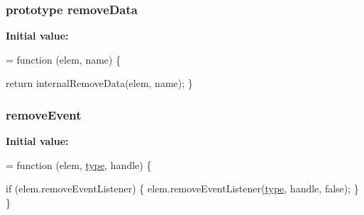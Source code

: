 \subsubsection[{\texorpdfstring{remove\+Data}{removeData}}]{ {\bf prototype} remove\+Data}\hypertarget{jquery-2_82_81-vsdoc_8js_a4da6cd95c6aa2933e1fc145392d22460}{}\label{jquery-2_82_81-vsdoc_8js_a4da6cd95c6aa2933e1fc145392d22460}
{\bfseries Initial value\+:}
\begin{DoxyCode}
= \textcolor{keyword}{function} (elem, name) \{
        

        \textcolor{keywordflow}{return} internalRemoveData(elem, name);
    \}
\end{DoxyCode}
\subsubsection[{\texorpdfstring{remove\+Event}{removeEvent}}]{ remove\+Event}\hypertarget{jquery-2_82_81-vsdoc_8js_aa1c5d81df6a0efc8b733d7df6f1faffd}{}\label{jquery-2_82_81-vsdoc_8js_aa1c5d81df6a0efc8b733d7df6f1faffd}
{\bfseries Initial value\+:}
\begin{DoxyCode}
= \textcolor{keyword}{function} (elem, \hyperlink{jquery-2_82_81-vsdoc_8js_a3940565e83a9bfd10d95ffd27536da91}{type}, handle) \{

        \textcolor{keywordflow}{if} (elem.removeEventListener) \{
            elem.removeEventListener(\hyperlink{jquery-2_82_81-vsdoc_8js_a3940565e83a9bfd10d95ffd27536da91}{type}, handle, \textcolor{keyword}{false});
        \}
    \}
\end{DoxyCode}
